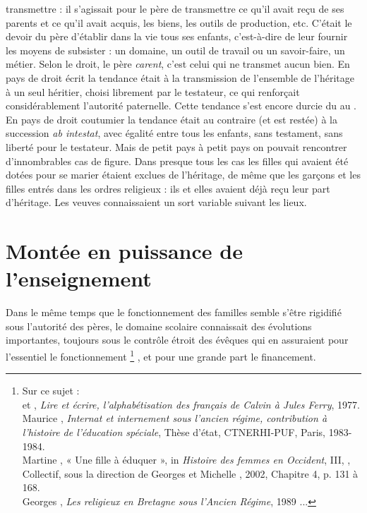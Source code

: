 \begin{enumerate}
transmettre : il s'agissait pour le père de transmettre ce qu'il avait reçu de ses parents et ce qu'il avait acquis, les biens, les outils de production, etc. C'était le devoir du père d'établir dans la vie tous ses enfants, c'est-à-dire de leur fournir les moyens de subsister : un domaine, un outil de travail ou un savoir-faire, un métier. Selon le droit, le père \emph{carent}, c'est celui qui ne transmet aucun bien. En pays de droit écrit la tendance était à la transmission de l'ensemble de l'héritage à un seul héritier, choisi librement par le testateur, ce qui renforçait considérablement l'autorité paternelle. Cette tendance s'est encore durcie du  au . En pays de droit coutumier la tendance était au contraire (et est restée) à la succession \emph{ab intestat}, avec égalité entre tous les enfants, sans testament, sans liberté pour le testateur. Mais de petit pays à petit pays on pouvait rencontrer d'innombrables cas de figure. Dans presque tous les cas les filles qui avaient été dotées pour se marier étaient exclues de l'héritage, de même que les garçons et les filles entrés dans les ordres religieux : ils et elles avaient déjà reçu leur part d'héritage. Les veuves connaissaient un sort variable suivant les lieux. 
\end{enumerate}

\section{Montée en puissance de l'enseignement}

Dans le même temps que le fonctionnement des familles semble s'être rigidifié sous l'autorité des pères, le domaine scolaire connaissait des évolutions importantes, toujours sous le contrôle étroit des évêques qui en assuraient pour l'essentiel le fonctionnement
\footnote{Sur ce sujet :
\\ et , \emph{Lire et écrire, l'alphabétisation des français de Calvin à Jules Ferry}, 1977.
\\Maurice {}, \emph{Internat et internement sous l'ancien régime, contribution à l'histoire de l'éducation spéciale}, Thèse d'état, CTNERHI-PUF, Paris, 1983-1984.
\\Martine {}, {« Une fille à éduquer », in \emph{Histoire des femmes en Occident}, III, }, Collectif, sous la direction de Georges  et Michelle , 2002, Chapitre 4, p. 131 à 168.
\\Georges {}, \emph{Les religieux en Bretagne sous l'Ancien Régime}, 1989 ...}%
, et pour une grande part le financement.

